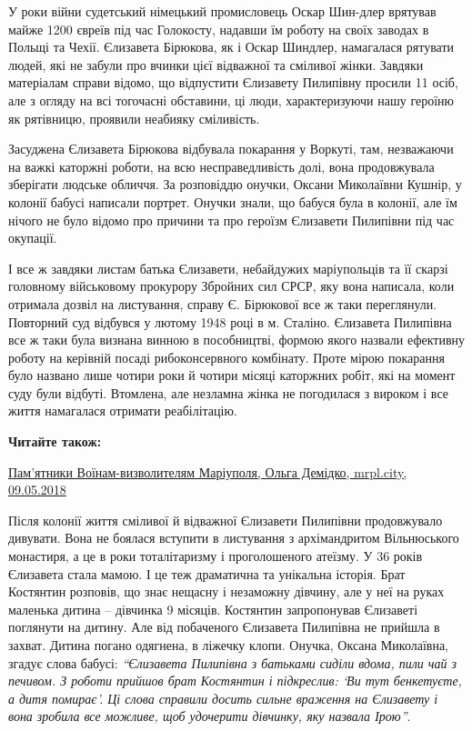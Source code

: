 
У роки війни судетський німецький промисловець Оскар Шин\hyp{}длер врятував майже
1200 євреїв під час Голокосту, надавши їм роботу на своїх заводах в Польщі та
Чехії. Єлизавета Бірюкова, як і Оскар Шиндлер, намагалася рятувати людей, які
не забули про вчинки цієї відважної та сміливої жінки. Завдяки матеріалам
справи відомо, що відпустити Єлизавету Пилипівну просили 11 осіб, але з огляду
на всі тогочасні обставини, ці люди, характеризуючи нашу героїню як рятівницю,
проявили неабияку сміливість.

Засуджена Єлизавета Бірюкова відбувала покарання у Воркуті, там, незважаючи на
важкі каторжні роботи, на всю несправедливість долі, вона продовжувала
зберігати людське обличчя. За розповіддю онучки, Оксани Миколаївни Кушнір, у
колонії бабусі написали портрет. Онучки знали, що бабуся була в колонії, але їм
нічого не було відомо про причини та про героїзм Єлизавети Пилипівни під час
окупації.


І все ж завдяки листам батька Єлизавети, небайдужих маріупольців та її скарзі
головному військовому прокурору Збройних сил СРСР, яку вона написала, коли
отримала дозвіл на листування, справу Є. Бірюкової все ж таки переглянули.
Повторний суд відбувся у лютому 1948 році в м. Сталіно. Єлизавета Пилипівна все
ж таки була визнана винною в пособництві, формою якого назвали ефективну роботу
на керівній посаді рибоконсервного комбінату. Проте мірою покарання було
названо лише чотири роки й чотири місяці каторжних робіт, які на момент суду
були відбуті. Втомлена, але незламна жінка не погодилася з вироком і все життя
намагалася отримати реабілітацію.

\textbf{Читайте також:} 

\href{https://mrpl.city/blogs/view/pamyatniki-voinam-vizvolitelyam-mariupolya}{%
Пам'ятники Воїнам-визволителям Маріуполя, Ольга Демідко, mrpl.city, 09.05.2018}

Після колонії життя сміливої й відважної Єлизавети Пилипівни продовжувало
дивувати. Вона не боялася вступити в листування з архімандритом Вільнюського
монастиря, а це в роки тоталітаризму і проголошеного атеїзму. У 36 років
Єлизавета стала мамою. І це теж драматична та унікальна історія. Брат Костянтин
розповів, що знає нещасну і незаможну дівчину, але у неї на руках маленька
дитина – дівчинка 9 місяців. Костянтин запропонував Єлизаветі поглянути на
дитину. Але від побаченого Єлизавета Пилипівна не прийшла в захват. Дитина
погано одягнена, в ліжечку клопи. Онучка, Оксана Миколаївна, згадує слова
бабусі: \emph{\enquote{Єлизавета Пилипівна з батьками сиділи вдома, пили чай з печивом. З
роботи прийшов брат Костянтин і підкреслив: \enquote{Ви тут бенкетуєте, а дитя
помирає}. Ці слова справили досить сильне враження на Єлизавету і вона зробила
все можливе, щоб удочерити дівчинку, яку назвала Ірою}}.

